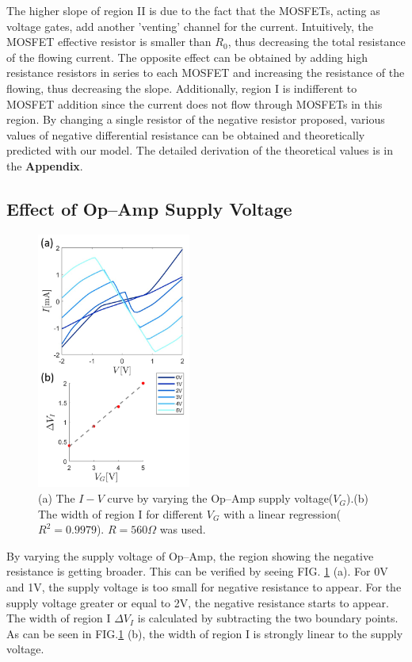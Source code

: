 \documentclass[%
 aip,
amsmath,amssymb,
reprint,
]{revtex4-1}
\begin{document}
The higher slope of region II is due to the fact that the MOSFETs, acting as voltage gates, add another 'venting' channel for the current. Intuitively, the MOSFET effective resistor is smaller than $R_0$, thus decreasing the total resistance of the flowing current. The opposite effect can be obtained by adding high resistance resistors in series to each MOSFET and increasing the resistance of the flowing, thus decreasing the slope. Additionally, region I is indifferent to MOSFET addition since the current does not flow through MOSFETs in this region. By changing a single resistor of the negative resistor proposed, various values of negative differential resistance can be obtained and theoretically predicted with our model. The detailed derivation of the theoretical values is in the \textbf{Appendix}.

\subsection{Effect of Op--Amp Supply Voltage}
\begin{figure}[!h]
  \includegraphics[width=0.45\textwidth]{figures/Fig3.png}
  \caption{(a) The $I-V$ curve by varying the Op--Amp supply voltage($V_G$).(b) The width of region I for different $V_G$ with a linear regression( $R^2=0.9979$). $R=560\Omega$ was used.}
  \label{fig:Fig3}
\end{figure}

By varying the supply voltage of Op--Amp, the region showing the negative resistance is getting broader. This can be verified by seeing FIG. \ref{fig:Fig3} (a). For 0V and 1V, the supply voltage is too small for negative resistance to appear. For the supply voltage greater or equal to 2V, the negative resistance starts to appear. The width of region I $\Delta V_I$ is calculated by subtracting the two boundary points. As can be seen in FIG.\ref{fig:Fig3} (b), the width of region I is strongly linear to the supply voltage. 
\end{document}
